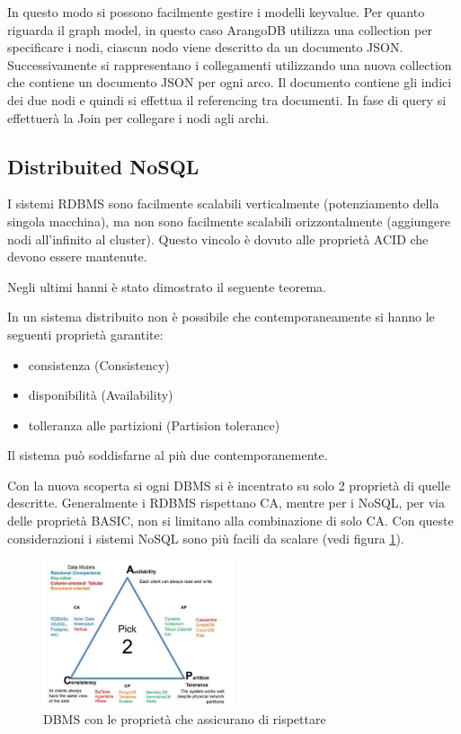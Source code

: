 In questo modo si possono facilmente gestire i modelli keyvalue. Per quanto riguarda 
il graph model, in questo caso ArangoDB utilizza una collection per specificare 
i nodi, ciascun nodo viene descritto da un documento JSON. Successivamente si 
rappresentano i collegamenti utilizzando una nuova collection che contiene un documento 
JSON per ogni arco. Il documento contiene gli indici dei due nodi e quindi si effettua
il referencing tra documenti. In fase di query si effettuerà la Join per collegare 
i nodi agli archi.

\subsection{Distribuited NoSQL}

I sistemi RDBMS sono facilmente scalabili verticalmente (potenziamento della singola 
macchina), ma non sono facilmente scalabili orizzontalmente (aggiungere nodi all'infinito al cluster).
Questo vincolo è dovuto alle proprietà ACID che devono essere mantenute.

Negli ultimi hanni è stato dimostrato il seguente teorema.

\begin{teorema} 
      In un sistema distribuito non è possibile che contemporaneamente si hanno 
      le seguenti proprietà garantite:
      \begin{itemize}
            \item consistenza (Consistency)
            \item disponibilità (Availability)
            \item tolleranza alle partizioni (Partision tolerance)
      \end{itemize}      
      Il sistema può soddisfarne al più due contemporanemente.
\end{teorema}

Con la nuova scoperta si ogni DBMS si è incentrato su solo 2 proprietà di quelle 
descritte. Generalmente i RDBMS rispettano CA, mentre per i NoSQL, per via delle 
proprietà BASIC, non si limitano alla combinazione di solo CA. Con queste considerazioni
i sistemi NoSQL sono più facili da scalare (vedi figura \ref{fig:cap}).

\begin{figure} [!h]
      \centering
      \includegraphics[width=0.5\textwidth]{img/nosql/CAP.png}
      \caption{DBMS con le proprietà che assicurano di rispettare}
      \label{fig:cap}
\end{figure}

